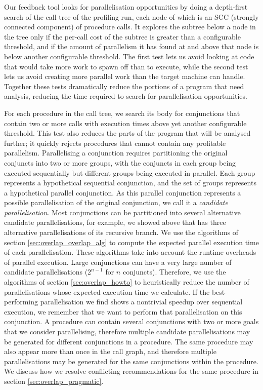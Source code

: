 Our feedback tool looks for parallelisation opportunities
by doing a depth-first search of the call tree of the profiling run,
each node of which is an SCC (strongly connected component) of procedure
calls.
It explores the subtree below a node in the tree
only if the per-call cost of the subtree is greater than a configurable
threshold,
and if the amount of parallelism it has found at and above that node
is below another configurable threshold.
The first test lets us avoid looking at code
that would take more work to spawn off than to execute,
while the second test lets us avoid creating
more parallel work than the target machine can handle.
Together these tests dramatically reduce the portions of a program that need
analysis,
reducing the time required to search for parallelisation opportunities.

For each procedure in the call tree,
we search its body for conjunctions that contain two or more calls with
execution times above yet another configurable threshold.
This test also reduces the parts of the program that will be analysed
further;
it quickly rejects procedures that cannot contain any profitable
parallelism.
Parallelising a conjunction
requires partitioning the original conjuncts into two or more groups,
with the conjuncts in each group being executed sequentially
but different groups being executed in parallel.
Each group represents a hypothetical sequential conjunction,
and the set of groups represents a hypothetical parallel conjunction.
As this parallel conjunction represents a possible parallelisation of the
original conjunction, we call it a \emph{candidate parallelisation}.
Most conjunctions can be partitioned into several alternative candidate
parallelisations,
for example, we showed above that \mapfoldl has three alternative
parallelisations of its recursive branch.
We use the algorithms of section \ref{sec:overlap_overlap_alg}
to compute the expected parallel execution time of each parallelisation.
These algorithms take into account the runtime overheads of parallel execution.
Large conjunctions can have a very large number of
candidate parallelisations ($2^{n-1}$ for $n$ conjuncts).
Therefore,
we use the algorithms of section \ref{sec:overlap_howto}
to heuristically reduce the number of parallelisations whose expected
execution time we calculate.
If the best-performing parallelisation we find
shows a nontrivial speedup over sequential execution,
we remember that we want to perform that parallelisation on this conjunction.
A procedure can contain several conjunctions with two or more goals that we
consider parallelising,
therefore multiple candidate parallelisations may be generated for different
conjunctions in a procedure.
The same procedure may also appear more than once in the call graph,
and therefore multiple parallelisations may be generated for the same
conjunctions within the procedure.
We discuss how we resolve conflicting recommendations for the same procedure
in section \ref{sec:overlap_pragmatic}.

